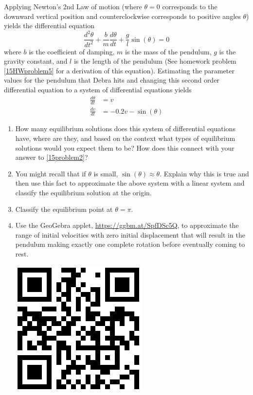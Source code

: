 Applying Newton's 2nd Law of motion (where $\theta = 0$ corresponds to the downward vertical position and counterclockwise corresponds to positive angles $\theta$) yields the differential equation
\[
\frac{d^2\theta}{dt^2}+\frac{b}{m}\frac{d\theta}{dt}+\frac{g}{l}\sin(\theta)=0
\]
where $b$ is the coefficient of damping, $m$ is the mass of the pendulum, $g$ is the gravity constant, and $l$ is the length of the pendulum (See homework problem \ref{15HWproblem5} for a derivation of this equation). Estimating the parameter values for the pendulum that Debra hits and changing this second order differential equation to a system of differential equations yields
\begin{align*}
\frac{d\theta}{dt} &=v \\
\frac{dv}{dt} &=-0.2v-\sin(\theta)
\end{align*}

\begin{enumerate}[resume]

\item How many equilibrium solutions does this system of differential equations have, where are they, and based on the context what types of equilibrium solutions would you expect them to be?  How does this connect with your answer to \ref{15problem2}? \label{15problem3} \vfill

\item You might recall that if $\theta$ is small, $\sin(\theta) \approx \theta$. Explain why this is true and then use this fact to approximate the above system with a linear system and classify the equilibrium solution at the origin. \label{15problem4} \vfill

\item Classify the equilibrium point at $\theta=\pi$. \label{15problem5} \vfill

\item Use the GeoGebra applet, \href{https://ggbm.at/SpfDSc5Q}{\underline{https://ggbm.at/SpfDSc5Q}}, to approximate the range of initial velocities with zero initial displacement that will result in the pendulum making exactly one complete rotation before eventually coming to rest. \label{15problem6}

\vspace{-.4in}\hspace{-.6in}\includegraphics[width=.5in]{15/15PendulumQR.png}
\vfill
\end{enumerate}
\clearpage

